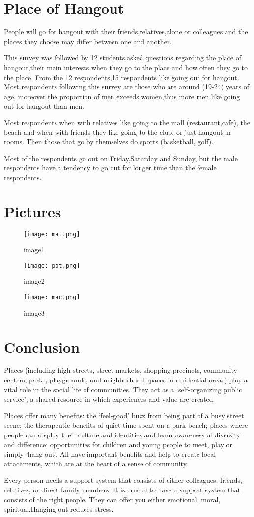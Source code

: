 \documentclass{article}
\begin{document}
\section{\textbf{Place of Hangout}}
People will go for hangout with their friends,relatives,alone or colleagues and the places they choose may differ between one and another.\par This survey was followed by 12 students,asked questions regarding the place of  hangout,their main interests when they go to the place and how often they go to the place. From the 12 respondents,15 respondents like going out for hangout. Most respondents following this survey are those who are around (19-24) years of age, moreover the proportion of men exceeds women,thus more men like going out for hangout than men.
\begin{center} Most respondents when with relatives like going to the mall (restaurant,cafe), the beach and when with friends they like going to the club, or just hangout in rooms. Then those that go by themselves do sports (basketball, golf).
\end{center}
Most of the respondents go out on Friday,Saturday and Sunday, but the male respondents have a tendency to go out for longer time than the female respondents.
\section{\textbf{Pictures}}
\begin{figure}[!htb]

\texttt{[image: mat.png]}
\caption{image1}
\endminipage\hfill
{}
\texttt{[image: pat.png]}
\caption{image2}
\endminipage\hfill
{}
\texttt{[image: mac.png]}
\caption{image3}
\endminipage\hfill


\end{figure}
\section{\textbf{Conclusion}}
  Places (including high streets, street markets, shopping precincts, community centers, parks, playgrounds, and neighborhood spaces in residential areas) play a vital role in the social life of communities.  They act as a ‘self-organizing public service’, a shared resource in which experiences and value are created.
 \par Places offer many benefits: the ‘feel-good’ buzz from being part of a busy street scene; the therapeutic benefits of quiet time spent on a park bench; places where people can display their culture and identities and learn awareness of diversity and difference; opportunities for children and young people to meet, play or simply ‘hang out’.  All have important benefits and help to create local attachments, which are at the heart of a sense of community.

Every person needs a support system that consists of either colleagues, friends, relatives, or direct family members. It is crucial to have a support system that consists of the right people. They can offer you either emotional, moral, spiritual.Hanging out reduces stress.
\end{document}
